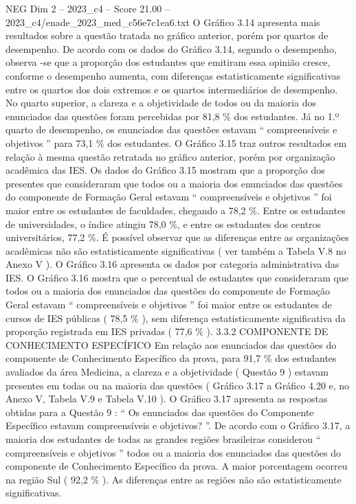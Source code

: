 \begin{textsample}{NEG Dim 2 – 2023\_c4 – Score 21.00 – 2023\_c4/enade\_2023\_med\_c56e7c1ea6.txt}
O Gráfico 3.14 apresenta mais resultados sobre a questão tratada no gráfico anterior, porém por quartos de desempenho.
De acordo com os dados do Gráfico 3.14, segundo o desempenho, observa -se que a proporção dos estudantes que emitiram essa opinião cresce, conforme o desempenho aumenta, com diferenças estatisticamente significativas entre os quartos dos dois extremos e os quartos intermediários de desempenho.
No quarto superior, a clareza e a objetividade de todos ou da maioria dos enunciados das questões foram percebidas por 81,8 \% dos estudantes.
Já no 1.º quarto de desempenho, os enunciados das questões estavam “ compreensíveis e objetivos ” para 73,1 \% dos estudantes.
O Gráfico 3.15 traz outros resultados em relação à mesma questão retratada no gráfico anterior, porém por organização acadêmica das IES.
Os dados do Gráfico 3.15 mostram que a proporção dos presentes que consideraram que todos ou a maioria dos enunciados das questões do componente de Formação Geral estavam “ compreensíveis e objetivos ” foi maior entre os estudantes de faculdades, chegando a 78,2 \%.
Entre os estudantes de universidades, o índice atingiu 78,0 \%, e entre os estudantes dos centros universitários, 77,2 \%.
É possível observar que as diferenças entre as organizações acadêmicas não são estatisticamente significativas ( ver também a Tabela V.8 no Anexo V ).
O Gráfico 3.16 apresenta os dados por categoria administrativa das IES.
O Gráfico 3.16 mostra que o percentual de estudantes que consideraram que todos ou a maioria dos enunciados das questões do componente de Formação Geral estavam “ compreensíveis e objetivos ” foi maior entre os estudantes de cursos de IES públicas ( 78,5 \% ), sem diferença estatisticamente significativa da proporção registrada em IES privadas ( 77,6 \% ). 3.3.2 COMPONENTE DE CONHECIMENTO ESPECÍFICO Em relação aos enunciados das questões do componente de Conhecimento Específico da prova, para 91,7 \% dos estudantes avaliados da área Medicina, a clareza e a objetividade ( Questão 9 ) estavam presentes em todas ou na maioria das questões ( Gráfico 3.17 a Gráfico 4.20 e, no Anexo V, Tabela V.9 e Tabela V.10 ).
O Gráfico 3.17 apresenta as respostas obtidas para a Questão 9 : “ Os enunciados das questões do Componente Específico estavam compreensíveis e objetivos? ”.
De acordo com o Gráfico 3.17, a maioria dos estudantes de todas as grandes regiões brasileiras considerou “ compreensíveis e objetivos ” todos ou a maioria dos enunciados das questões do componente de Conhecimento Específico da prova.
A maior porcentagem ocorreu na região Sul ( 92,2 \% ).
As diferenças entre as regiões não são estatisticamente significativas.

\end{textsample}
